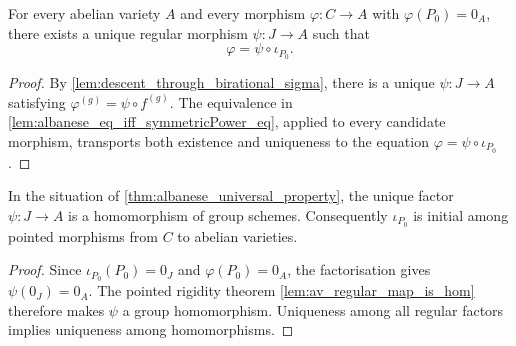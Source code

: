 \begin{theorem}
  \label{thm:albanese_universal_property}

  For every abelian variety \(A\) and every morphism
  \(\varphi\colon C\to A\) with \(\varphi(P_0)=0_A\), there exists a unique
  regular morphism \(\psi\colon J\to A\) such that
  \[
    \varphi=\psi\circ\iota_{P_0}.
  \]
\end{theorem}

\begin{proof}
  By \cref{lem:descent_through_birational_sigma}, there is a unique
  \(\psi\colon J\to A\) satisfying
  \(\varphi^{(g)}=\psi\circ f^{(g)}\).  The equivalence in
  \cref{lem:albanese_eq_iff_symmetricPower_eq}, applied to every candidate
  morphism, transports both existence and uniqueness to the equation
  \(\varphi=\psi\circ\iota_{P_0}\).
\end{proof}

\begin{corollary}
  \label{cor:albanese_universal_property_homomorphism}

  In the situation of \cref{thm:albanese_universal_property}, the unique
  factor \(\psi\colon J\to A\) is a homomorphism of group schemes.
  Consequently \(\iota_{P_0}\) is initial among pointed morphisms from
  \(C\) to abelian varieties.
\end{corollary}

\begin{proof}
  Since \(\iota_{P_0}(P_0)=0_J\) and \(\varphi(P_0)=0_A\), the
  factorisation gives \(\psi(0_J)=0_A\).  The pointed rigidity theorem
  \cref{lem:av_regular_map_is_hom} therefore makes \(\psi\) a group
  homomorphism.  Uniqueness among all regular factors implies uniqueness
  among homomorphisms.
\end{proof}
